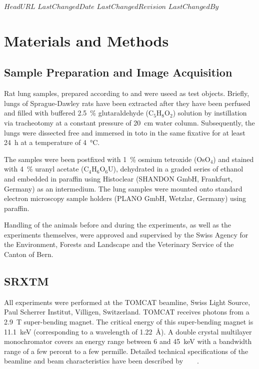 \svnidlong
{$HeadURL$}
{$LastChangedDate$}
{$LastChangedRevision$}
{$LastChangedBy$}

\ifhtml
\else
\begin{center}
\end{center}
\fi

\section{Materials and Methods}%
\label{sec:materials and methods}%
\subsection{Sample Preparation and Image Acquisition}%
Rat lung samples, prepared according to %
\ifhtml
	\citet{Tschanz2002,Schittny1997}
\else
	 and 
\fi%
were useed as test objects. Briefly, lungs of Sprague-Dawley rats have been extracted after they have been perfused and filled with buffered \SI{2.5}{\percent} glutaraldehyde (C$_5$H$_8$O$_2$) solution by instillation via tracheotomy at a constant pressure of \SI{20}{\centi\meter} water column. Subsequently, the lungs were dissected free and immersed in toto in the same fixative for at least \SI{24}{\hour} at a temperature of \SI{4}{\celsius}.

The samples were been postfixed with \SI{1}{\percent} osmium tetroxide (OsO$_4$) and stained with \SI{4}{\percent} uranyl acetate (C$_4$H$_6$O$_6$U), dehydrated in a graded series of ethanol and embedded in paraffin using Histoclear (SHANDON GmbH, Frankfurt, Germany) as an intermedium. The lung samples were mounted onto standard electron microscopy sample holders (PLANO GmbH, Wetzlar, Germany) using paraffin.

Handling of the animals before and during the experiments, as well as the experiments themselves, were approved and supervised by the Swiss Agency for the Environment, Forests and Landscape and the Veterinary Service of the Canton of Bern.

\subsection{SRXTM}%
All experiments were performed at the TOMCAT beamline, Swiss Light Source, Paul Scherrer Institut, Villigen, Switzerland. TOMCAT receives photons from a \SI{2.9}{\tesla} super-bending magnet. The critical energy of this super-bending magnet is \SI{11.1}{\kilo\electronvolt} (corresponding to a wavelength of \SI{1.22}{\angstrom}). A double crystal multilayer monochromator covers an energy range between 6 and \SI{45}{\kilo\electronvolt} with a bandwidth range of a few percent to a few permille. Detailed technical specifications of the beamline and beam characteristics have been described by%
\ifhtml
	~\citet{Stampanoni2006a}
\else
	~
\fi%
.

